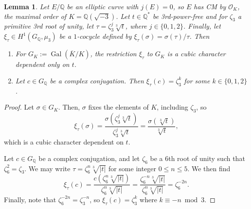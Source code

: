 \documentclass[11pt]{amsart}
\newtheorem{lemma}[defn]{Lemma}
\theoremstyle{definition}
\newcommand{\Q}{\mathbb Q}
\newcommand{\OO}{\mathcal{O}}
\newcommand{\Gal}{\operatorname{Gal}}
\begin{document}
\begin{lemma}\label{cubic_twist}
Let $E/\Q$ be an elliptic curve with $j(E) = 0$, so $E$ has CM by $\OO_K$, the maximal order of $K = \Q(\sqrt{-3})$.
Let $t \in \Q^{\ast}$ be 3rd-power-free and for $\zeta_3$ a primitive 3rd root of unity, let $\tau = \zeta_3^j \sqrt[3]{t}$, where $j \in \{0, 1, 2\}$. Finally, let $\xi_{\tau} \in H^1(G_{\Q}, \mu_3)$ be a $1$-cocycle defined by $\xi_{\tau}(\sigma) = \sigma(\tau)/\tau$. Then

\begin{enumerate}
    \item For $G_K := \Gal(\overline{K}/K)$, the restriction $\xi_\tau$ to $G_K$ is a cubic character dependent only on $t$.
    \item Let $c \in G_\Q$ be a complex conjugation. Then $\xi_{\tau}(c) = \zeta_3^{k}$ for some $k \in \{0, 1, 2\}$.
\end{enumerate}

\end{lemma}

\begin{proof}
    Let $\sigma \in G_K$. Then, $\sigma$ fixes the elements of $K$, including $\zeta_3$, so
\[ 
    \xi_{\tau} (\sigma) 
   = \frac{\sigma(\zeta_3^{j}\sqrt[3]{t})}{\zeta_3^{j}\sqrt[3]{t}} 
   = \frac{\sigma(\sqrt[3]{t})}{\sqrt[3]{t}},
\]
which is a cubic character dependent on $t$.

Let $c \in G_{\Q}$ be a complex conjugation, and let $\zeta_6$ be a 6th root of unity such that $\zeta_6^2 = \zeta_3$. We may write $\tau = \zeta_6^n \sqrt[3]{|t|}$ for some integer $0 \leq n \leq 5$. %
We then find
\[  \xi_{\tau}(c) = \frac{c(\zeta_6^n \sqrt[3]{|t|})}{\zeta_6^n \sqrt[3]{|t|}} = \frac{\zeta_6^{-n} \sqrt[3]{|t|}}{\zeta_6^n \sqrt[3]{|t|}} = \zeta_6^{-2n}. \]
Finally, note that $\zeta_6^{-2n} = \zeta_3^{-n}$, so $\xi_{\tau}(c) = \zeta_3^{k}$ where $k \equiv - n \bmod 3$.
\end{proof}
\end{document}

